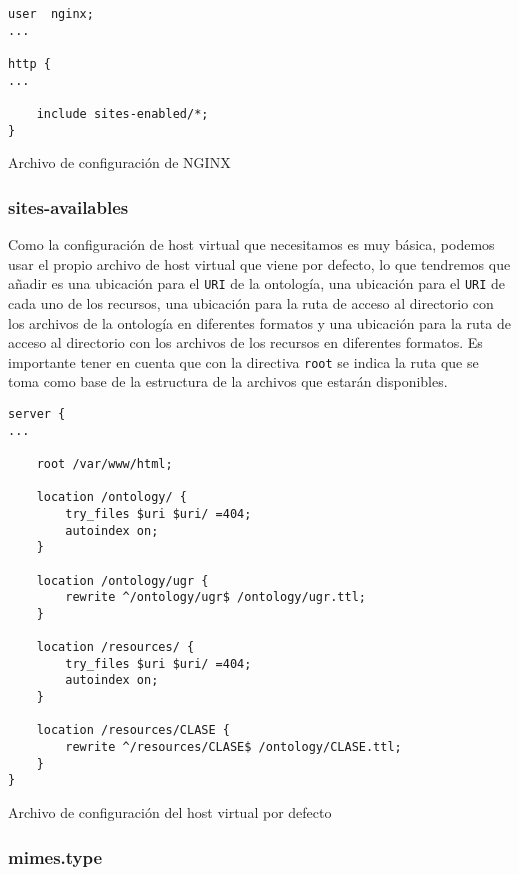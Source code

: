 \begin{listing}[!ht]
\begin{verbatim}
user  nginx;
...

http {
...

    include sites-enabled/*;
}
\end{verbatim}
\caption{Archivo de configuración de {\sf NGINX}}
\end{listing}

\subsubsection{sites-availables}

Como la configuración de host virtual que necesitamos es muy básica, podemos usar el propio archivo de host virtual que viene por defecto, lo que tendremos que añadir es una ubicación para el {\tt URI} de la ontología, una ubicación para el {\tt URI} de cada uno de los recursos, una ubicación para la ruta de acceso al directorio con los archivos de la ontología en diferentes formatos y una ubicación para la ruta de acceso al directorio con los archivos de los recursos en diferentes formatos. Es importante tener en cuenta que con la directiva {\tt root} se indica la ruta que se toma como base de la estructura de la archivos que estarán disponibles.

\bigskip
\begin{listing}[!ht]
\begin{verbatim}
server {
...

    root /var/www/html;
	
    location /ontology/ {
        try_files $uri $uri/ =404;
        autoindex on;
    }
	
    location /ontology/ugr {
        rewrite ^/ontology/ugr$ /ontology/ugr.ttl;
    }

    location /resources/ {
        try_files $uri $uri/ =404;
        autoindex on;
    }

    location /resources/CLASE {
        rewrite ^/resources/CLASE$ /ontology/CLASE.ttl;
    }
}
\end{verbatim}
\caption{Archivo de configuración del {\sf host virtual} por defecto}
\end{listing}

\subsubsection{mimes.type}

